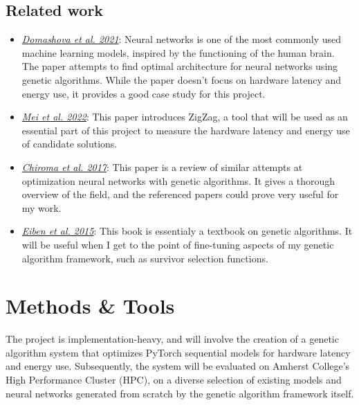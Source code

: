 \documentclass[sigconf]{acmart}
\begin{document}
\subsection{Related work}
\begin{itemize}
  \setlength\itemsep{1em}
  \item[] \emph{\href{https://www.sciencedirect.com/science/article/pii/S1877050921012801?ref=pdf_download&fr=RR-2&rr=868a43d10db70f71}{Domashova et al. 2021}}: Neural networks is one of the most commonly used machine learning models, inspired by the functioning of the human brain. 
                                  The paper attempts to find optimal architecture for neural networks using genetic algorithms. While the paper doesn't focus on hardware latency and energy use, it provides a good case study for this project.
  
  \item[] \emph{\href{https://ieeexplore.ieee.org/document/9360462}{Mei et al. 2022}}: 
                                  This paper introduces ZigZag, a tool that will be used as an essential part of this project to measure the hardware latency and energy use of candidate solutions.
  
  \item[] \emph{\href{https://www.researchgate.net/publication/321021361_Neural_Networks_Optimization_through_Genetic_Algorithm_Searches_A_Review}{Chiroma et al. 2017}}:
                                  This paper is a review of similar attempts at optimization neural networks with genetic algorithms. It gives a thorough overview of the field, and the referenced papers could prove very useful for my work.

  \item[] \emph{\href{https://link.springer.com/book/10.1007/978-3-662-44874-8}{Eiben et al. 2015}}:
                                  This book is essentialy a textbook on genetic algorithms. It will be useful when I get to the point of fine-tuning aspects of my genetic algorithm framework, such as survivor selection functions.  
  
\end{itemize}

\section{Methods \& Tools}

The project is implementation-heavy, and will involve the creation of a genetic algorithm system 
that optimizes PyTorch sequential models for hardware latency and energy use. Subsequently, the system will
be evaluated on Amherst College's High Performance Cluster (HPC), on a diverse selection of existing models and neural networks
generated from scratch by the genetic algorithm framework itself.
\end{document}
